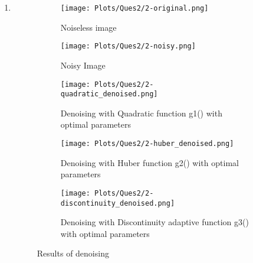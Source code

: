 \documentclass[11pt]{article}
\begin{document}
\begin{enumerate}
\begin{enumerate}
        \item 
        \begin{figure}[H]
            \centering
            \begin{subfigure}[b]{0.4\textwidth}
                 \centering
                 \texttt{[image: Plots/Ques2/2-original.png]}
                 \caption{Noiseless image}
            \end{subfigure}
            \begin{subfigure}[b]{0.4\textwidth}
                 \centering
                 \texttt{[image: Plots/Ques2/2-noisy.png]}
                 \caption{Noisy Image}
            \end{subfigure}
            \begin{subfigure}[b]{0.4\textwidth}
                 \centering
                 \texttt{[image: Plots/Ques2/2-quadratic\_denoised.png]}
                 \caption{Denoising with Quadratic function g1() with optimal parameters}
            \end{subfigure}
            \begin{subfigure}[b]{0.4\textwidth}
                 \centering
                 \texttt{[image: Plots/Ques2/2-huber\_denoised.png]}
                 \caption{Denoising with Huber function g2() with optimal parameters}
            \end{subfigure}
            \begin{subfigure}[b]{0.4\textwidth}
                 \centering
                 \texttt{[image: Plots/Ques2/2-discontinuity\_denoised.png]}
                 \caption{Denoising with Discontinuity adaptive function g3() with optimal parameters}
            \end{subfigure}
            \caption{Results of denoising}
            \label{fig:my_label}
        \end{figure}
        

\end{enumerate}
\end{enumerate}
\end{document}
